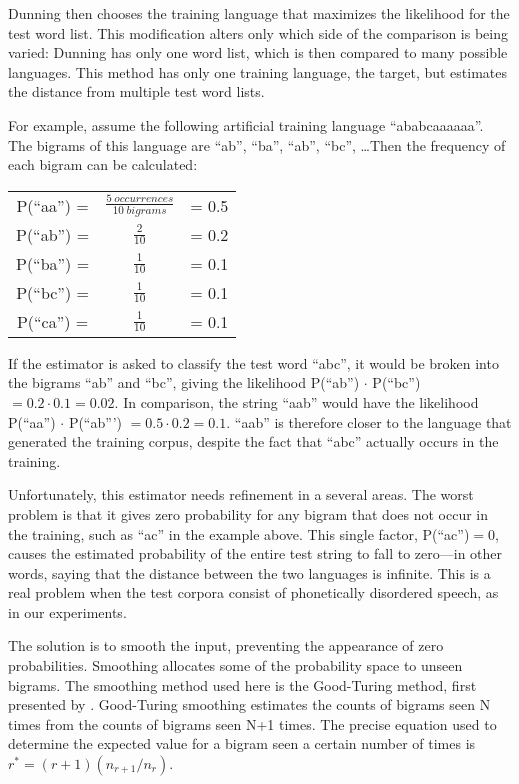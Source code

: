 \documentclass[11pt]{article}
\begin{document}
Dunning then chooses the training language that maximizes the
likelihood for
the test word list. This modification alters only which side of
the comparison is being varied: Dunning has only one word list, which
is then compared to many possible languages. This method has only one
training language, the target, but estimates the distance from
multiple test word lists.


For example, assume the following
artificial training language ``ababcaaaaaa''. The bigrams of this
language are ``ab'', ``ba'', ``ab'', ``bc'', \ldots Then the frequency
of each bigram can be calculated:

\begin{tabular}{ccc}
P(``aa'') = & $\frac{5\ occurrences}{10\ bigrams}$ & = 0.5 \\
P(``ab'') = & $\frac{2}{10}$ & = 0.2 \\
P(``ba'') = & $\frac{1}{10}$ & = 0.1 \\
P(``bc'') = & $\frac{1}{10}$ & = 0.1 \\
P(``ca'') = & $\frac{1}{10}$ & = 0.1 \\
\end{tabular}

If the estimator is asked to classify the test word ``abc'', it would
be broken into the bigrams ``ab'' and ``bc'', giving the likelihood
P(``ab'') $\cdot$ P(``bc'') $= 0.2 \cdot 0.1 = 0.02$. In comparison,
the string ``aab'' would have the likelihood P(``aa'') $\cdot$
P(``ab''') $= 0.5 \cdot 0.2 = 0.1 $. ``aab'' is therefore closer to
the language that generated the training corpus, despite the fact that
``abc'' actually occurs in the training.

Unfortunately, this estimator needs refinement in a several areas. The
worst problem is that it gives zero probability for any bigram that
does not occur in the training, such as ``ac'' in the example
above. This single factor, P(``ac'')$=0$, causes the estimated
probability of the entire test string to fall to zero---in other
words, saying that the distance between the two languages is
infinite. This is a real problem when the test corpora consist of
phonetically disordered speech, as in our experiments.

The solution is to smooth the input, preventing the appearance of
zero probabilities. Smoothing allocates some of the probability space
to unseen bigrams. The smoothing method used here is the
Good-Turing method, first presented by \cite{good53}.
Good-Turing smoothing estimates the counts of bigrams seen N times
from the counts of bigrams seen N+1 times. The precise equation used to
determine the expected value for a bigram
seen a certain number of times is
$r^* = (r+1)(n_{r+1} / n_r)$.
\end{document}
